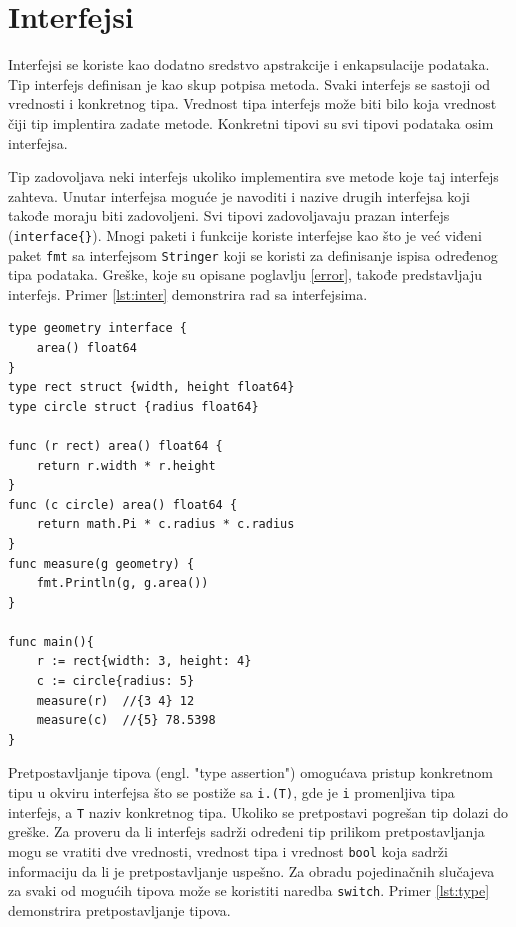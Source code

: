 \documentclass[12pt,oneside]{memoir}
\begin{document}
\section{Interfejsi}

Interfejsi se koriste kao dodatno sredstvo apstrakcije i enkapsulacije podataka. Tip interfejs definisan je kao skup potpisa metoda. Svaki interfejs se sastoji od vrednosti i konkretnog tipa. Vrednost tipa interfejs može biti bilo koja vrednost čiji tip implentira zadate metode. Konkretni tipovi su svi tipovi podataka osim interfejsa.

Tip zadovoljava neki interfejs ukoliko implementira sve metode koje taj interfejs zahteva. Unutar interfejsa moguće je navoditi i nazive drugih interfejsa koji takođe moraju biti zadovoljeni. Svi tipovi zadovoljavaju prazan interfejs (\texttt{interface\{\}}). Mnogi paketi i funkcije koriste interfejse kao što je već viđeni paket \texttt{fmt} sa interfejsom \texttt{Stringer} koji se koristi za definisanje ispisa određenog tipa podataka. Greške, koje su opisane poglavlju \ref{error}, takođe predstavljaju interfejs. Primer \ref{lst:inter} demonstrira rad sa interfejsima.

\begin{center}
\begin{lstlisting}[caption=Rad sa interfejsima, label={lst:inter},  backgroundcolor=\color{background}]
type geometry interface { 
	area() float64 
}
type rect struct {width, height float64}
type circle struct {radius float64}

func (r rect) area() float64 {
	return r.width * r.height
}
func (c circle) area() float64 {
	return math.Pi * c.radius * c.radius
}
func measure(g geometry) {
	fmt.Println(g, g.area())
}

func main(){
	r := rect{width: 3, height: 4}	
	c := circle{radius: 5}			
	measure(r)	//{3 4} 12 
  	measure(c)	//{5} 78.5398 
}
\end{lstlisting}
\end{center}

Pretpostavljanje tipova (engl. "type assertion") omogućava pristup konkretnom tipu u okviru interfejsa što se postiže sa \texttt{i.(T)}, gde je \texttt{i} promenljiva tipa interfejs, a \texttt{T} naziv konkretnog tipa. Ukoliko se pretpostavi pogrešan tip dolazi do greške.  Za proveru da li interfejs sadrži određeni tip prilikom pretpostavljanja mogu se vratiti dve vrednosti, vrednost tipa i vrednost \texttt{bool} koja sadrži informaciju da li je pretpostavljanje uspešno. Za obradu pojedinačnih slučajeva za svaki od mogućih tipova može se koristiti naredba \texttt{switch}.  Primer \ref{lst:type} demonstrira pretpostavljanje tipova.
\end{document}
